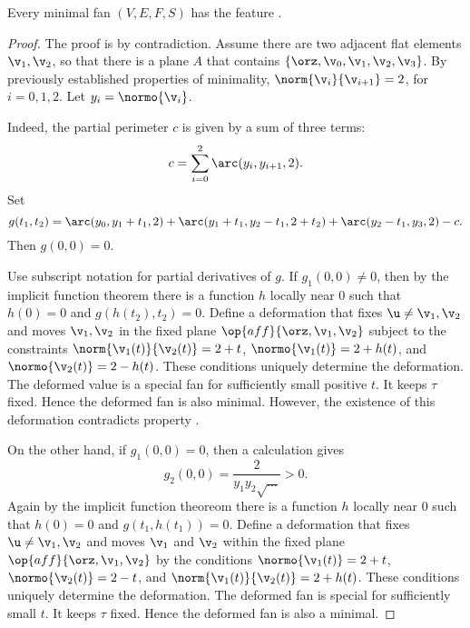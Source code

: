 \begin{lemma}[] 
Every minimal fan $(V,E,F,S)$ has the feature .
\end{lemma}

\begin{proof}  The proof is by contradiction.
Assume there are two adjacent flat elements $\v_1,\v_2$, so that
there is a plane $A$ that contains $\{\orz,\v_0,\v_1,\v_2,\v_3\}$.
By previously established properties of minimality,
%
$\norm{\v_i}{\v_{i+1}}=2$, for $i=0,1,2$.  Let $y_i = \normo{\v_i}$.
%

  Indeed, the partial
perimeter $c$ is given by a sum of three terms:
\begin{displaymath}
c=\sum_{i=0}^2\arc(y_i,y_{i+1},2).
\end{displaymath}
Set
\begin{displaymath}
  g(t_1,t_2) = \arc(y_0,y_1+t_1,2) 
+ \arc(y_1+t_1,y_2-t_1,2+t_2) + \arc(y_2-t_1,y_3,2) - c.
\end{displaymath}
Then $g(0,0)=0$.  

Use subscript notation for partial derivatives of $g$.  If $g_1(0,0)
\ne 0$, then by the implicit function theorem there is a function $h$
locally near $0$ such that $h(0)=0$ and $g(h(t_2),t_2)=0$.  Define a
deformation that fixes $\u\ne\v_1,\v_2$ and moves $\v_1,\v_2$ in the
fixed plane $\op{aff}\{\orz,\v_1,\v_2\}$ subject to the constraints
$\norm{\v_1(t)}{\v_2(t)}=2+t$, $\normo{\v_1(t)} = 2+h(t)$, and
$\normo{\v_2(t)} = 2-h(t)$.  These conditions uniquely determine the
deformation.  The deformed value is a special fan for sufficiently
small positive $t$.  It keeps $\tau$ fixed.  Hence the deformed fan is
also minimal.  However, the existence of this deformation contradicts
property .

On the other hand, if $ g_1(0,0) =0$, then a calculation gives
\begin{displaymath}g_2(0,0) = \dfrac{2}{y_1y_2\sqrt{\ldots}} >
0.\end{displaymath} Again by the implicit function theoreom there is
a function $h$ locally near $0$ such that $h(0)=0$ and
$g(t_1,h(t_1))=0$.  Define a deformation that fixes $\u\ne \v_1,\v_2$
and moves $\v_1$ and $\v_2$ within the fixed plane
$\op{aff}\{\orz,\v_1,\v_2\}$ by the conditions $\normo{\v_1(t)} = 2 +
t$, $\normo{\v_2(t)} = 2 - t$, and $\norm{\v_1(t)}{\v_2(t)}=2+h(t)$.
These conditions uniquely determine the deformation.  The deformed fan
is special for sufficiently small $t$.  It keeps $\tau$ fixed.  Hence
the deformed fan is also a minimal.


\end{proof}
